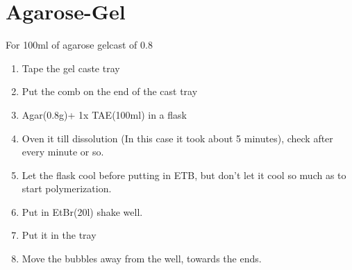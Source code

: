 \documentclass[11pt,twoside,a4paper]{article}
\begin{document}
\section{Agarose-Gel}
For 100ml of agarose gelcast of 0.8%
\begin{enumerate}
	\item Tape the gel caste tray
	\item Put the comb on the end of the cast tray
	\item Agar(0.8g)+ 1x TAE(100ml) in a flask
	\item Oven it till dissolution (In this case it took about 5 minutes), check after every minute or so.
	\item Let the flask cool before putting in ETB, but don't let it cool so much as to start polymerization.
	\item Put in EtBr(20\textmu{}l) shake well.
	\item Put it in the tray
	\item Move the bubbles away from the well, towards the ends.
\end{enumerate}
\end{document}
